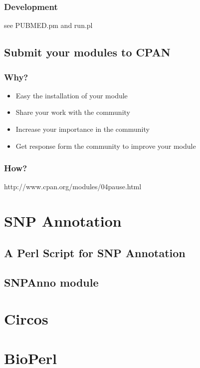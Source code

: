\documentclass[UTF8]{beamer}
\begin{document}
\begin{frame}
  \frametitle{Development}
  see PUBMED.pm and run.pl
\end{frame}

\subsection{Submit your modules to CPAN}

\begin{frame}
  \frametitle{Why?}
  \begin{itemize}
    \item Easy the installation of your module
    \item Share your work with the community
    \item Increase your importance in the community
    \item Get response form the community to improve your module
  \end{itemize}
\end{frame}

\begin{frame}
  \frametitle{How?}
  http://www.cpan.org/modules/04pause.html
\end{frame}

\section{SNP Annotation}

\subsection{A Perl Script for SNP Annotation}

\subsection{SNPAnno module}

\section{Circos}

\section{BioPerl}
\end{document}
